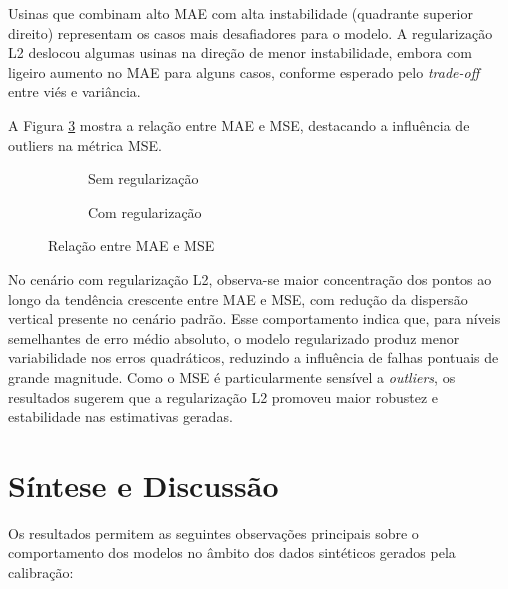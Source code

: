 Usinas que combinam alto \ac{MAE} com alta instabilidade (quadrante superior direito) representam os casos mais desafiadores para o modelo. A regularização L2 deslocou algumas usinas na direção de menor instabilidade, embora com ligeiro aumento no \ac{MAE} para alguns casos, conforme esperado pelo \textit{trade-off} entre viés e variância.

A Figura \ref{fig:mae_X_mse} mostra a relação entre \ac{MAE} e \ac{MSE}, destacando a influência de outliers na métrica \ac{MSE}.

\begin{figure}[H]
    \centering
    \begin{subfigure}{0.6\textwidth}
        \centering
        
        \caption{Sem regularização}
        \label{fig:mse_padrao}
    \end{subfigure}
    
    \vspace{0.5cm}
    
    \begin{subfigure}{0.6\textwidth}
        \centering
        
        \caption{Com regularização}
        \label{fig:mse_l2}
    \end{subfigure}
    \caption{Relação entre MAE e MSE}
    \label{fig:mae_X_mse}
\end{figure}

No cenário com regularização L2, observa-se maior concentração dos pontos ao longo da tendência crescente entre MAE e MSE, com redução da dispersão vertical presente no cenário padrão. Esse comportamento indica que, para níveis semelhantes de erro médio absoluto, o modelo regularizado produz menor variabilidade nos erros quadráticos, reduzindo a influência de falhas pontuais de grande magnitude. Como o MSE é particularmente sensível a \textit{outliers}, os resultados sugerem que a regularização L2 promoveu maior robustez e estabilidade nas estimativas geradas.

\section{Síntese e Discussão}

Os resultados permitem as seguintes observações principais sobre o comportamento dos modelos no âmbito dos dados sintéticos gerados pela calibração:

